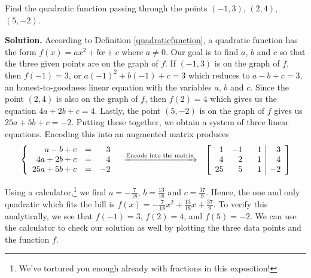 \begin{ex}  \label{matrixcurvefitting} Find the quadratic function passing through the points $(-1,3)$, $(2,4)$, $(5,-2)$.

\smallskip

{\bf Solution.} According to Definition \ref{quadraticfunction}, a quadratic function has the form $f(x) =ax^2+bx+c$ where $a \neq 0$.   Our goal is to find $a$, $b$ and $c$ so that the three given points are on the graph of $f$.   If $(-1,3)$ is on the graph of $f$, then $f(-1) = 3$, or $a(-1)^2+b(-1) + c = 3$ which reduces to $a-b+c=3$, an honest-to-goodness linear equation with the variables $a$, $b$ and $c$.  Since the point $(2,4)$ is also on the graph of $f$, then $f(2) = 4$ which gives us the equation $4a+2b+c = 4$.  Lastly, the point $(5,-2)$ is on the graph of $f$ gives us $25a+5b+c = -2$.  Putting these together, we obtain a system of three linear equations.  Encoding this into an augmented matrix produces
\[ \begin{array}{ccc}

\left\{ \begin{array}{rcr} 
a-b+c & = & 3 \\ 
4a+2b+c & = & 4 \\ 
25a+5b+c & = & -2  \end{array} \right.

&

\xrightarrow{\text{Encode into the matrix}}

&

 \left[ \begin{array}{rrr|r}
1 & -1 & \hphantom{-}1 & 3 \\
 4 & 2 & 1 & 4 \\
 25 & 5 & 1 & -2 \\ \end{array} \right]

 \end{array}\]

Using a calculator,\footnote{We've tortured you enough already with fractions in this exposition!} we find $a = -\frac{7}{18}$, $b = \frac{13}{18}$ and $c = \frac{37}{9}$.  Hence, the one and only quadratic which fits the bill is $f(x) = -\frac{7}{18} x^2 + \frac{13}{18} x + \frac{37}{9}$.  To verify this analytically, we see that $f(-1) = 3$, $f(2) = 4$, and $f(5) = -2$.  We can use the calculator to check our solution as well by plotting the three data points and the function $f$.
\begin{center}


\end{center}
\end{ex}
